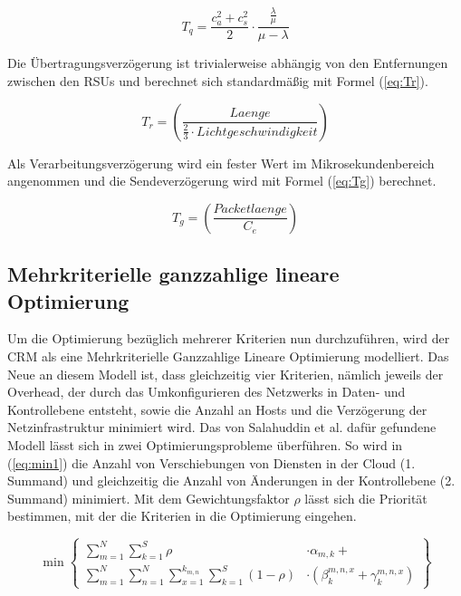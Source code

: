 \documentclass[conference]{IEEEtran}
\begin{document}
\begin{equation}
T_q=\frac{c_a^2+c_s^2}{2}\cdot \frac{\frac{\lambda}{\mu}}{\mu-\lambda}
\label{eq:Tq}
\end{equation}

Die Übertragungsverzögerung ist trivialerweise abhängig von den Entfernungen zwischen den RSUs und berechnet sich standardmäßig mit Formel (\ref{eq:Tr}).

\begin{equation}
T_r=\left(\frac{Laenge}{\frac{2}{3}\cdot Lichtgeschwindigkeit}\right)
\label{eq:Tr}
\end{equation}

Als Verarbeitungsverzögerung wird ein fester Wert im Mikrosekundenbereich angenommen und die Sendeverzögerung wird mit Formel (\ref{eq:Tg}) berechnet.

\begin{equation}
T_g=\left(\frac{Packetlaenge}{C_e}\right)
\label{eq:Tg}
\end{equation}


\subsection{Mehrkriterielle ganzzahlige lineare Optimierung}

Um die Optimierung bezüglich mehrerer Kriterien nun durchzuführen, wird der CRM als eine Mehrkriterielle Ganzzahlige Lineare Optimierung modelliert. Das Neue an diesem Modell ist, dass gleichzeitig vier Kriterien, nämlich jeweils der Overhead, der durch das Umkonfigurieren des Netzwerks in Daten- und Kontrollebene entsteht, sowie die Anzahl an Hosts und die Verzögerung der Netzinfrastruktur minimiert wird. Das von Salahuddin et al. dafür gefundene Modell lässt sich in zwei Optimierungsprobleme überführen.
So wird in (\ref{eq:min1}) die Anzahl von Verschiebungen von Diensten in der Cloud (1. Summand) und gleichzeitig die Anzahl von Änderungen in der Kontrollebene (2. Summand) minimiert. Mit dem Gewichtungsfaktor \(\rho\) lässt sich die Priorität bestimmen, mit der die Kriterien in die Optimierung eingehen. 

\begin{equation}
     \min\left\{\begin{split} \sum\limits_{m=1}^N \sum\limits_{k=1}^S \rho &\cdot\alpha_{m,k} + \\
         \sum\limits_{m=1}^N \sum\limits_{n=1}^N \sum\limits_{x=1}^{k_{m,n}}
\sum\limits_{k=1}^S (1-\rho)&\cdot(\beta_{k}^{m,n,x}+ \gamma_{k}^{m,n,x})\end{split}\right\}
\label{eq:min1}
\end{equation}
\end{document}
